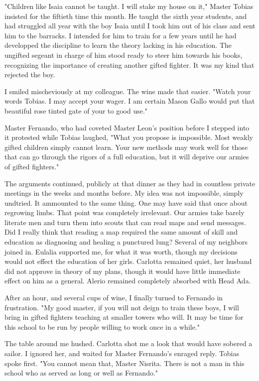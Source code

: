 \documentclass{article}
\begin{document}
"Children like Isaia cannot be taught. I will stake my house on it," Master Tobias insisted for the fiftieth time this month. He taught the sixth year students, and had struggled all year with the boy Isaia until I took him out of his class and sent him to the barracks. I intended for him to train for a few years until he had developped the discipline to learn the theory lacking in his education. The ungifted segeant in charge of him stood ready to steer him towards his books, recognizing the importance of creating another gifted fighter. It was my kind that rejected the boy.

I smiled mischeviously at my colleague. The wine made that easier. "Watch your words Tobias. I may accept your wager. I am certain Mason Gallo would put that beautiful rose tinted gate of your to good use."

Master Fernando, who had coveted Master Leon's position before I stepped into it protested while Tobias laughed, "What you propose is impossible. Most weakly gifted children simply cannot learn. Your new methods may work well for those that can go through the rigors of a full education, but it will deprive our armies of gifted fighters."

The arguments continued, publicly at that dinner as they had in countless private meetings in the weeks and months before. My idea was not impossible, simply undtried. It ammounted to the same thing. One may have said that once about regrowing limbs. That point was completely irrelevant. Our armies take barely literate men and turn them into scouts that can read maps and send messages. Did I really think that reading a map required the same amount of skill and education as diagnosing and healing a punctured lung? Several of my neighbors joined in. Eulalia supported me, for what it was worth, though my decisions would not effect the education of her girls. Carlotta remained quiet, her husband did not approve in theory of my plans, though it would have little immediate effect on him as a general. Alerio remained completely absorbed with Head Ada.

After an hour, and several cups of wine, I finally turned to Fernando in frustration. "My good master, if you will not deign to train these boys, I will bring in gifted fighters teaching at smaller towers who will. It may be time for this school to be run by people willing to work once in a while."

The table around me hushed. Carlotta shot me a look that would have sobered a sailor. I ignored her, and waited for Master Fernando's enraged reply. Tobias spoke first. "You cannot mean that, Master Nisrita. There is not a man in this school who as served as long or well as Fernando."
\end{document}
